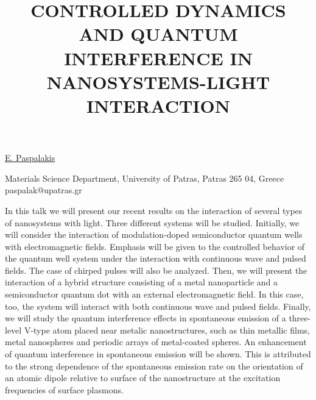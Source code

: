 \title{CONTROLLED DYNAMICS AND QUANTUM INTERFERENCE IN NANOSYSTEMS-LIGHT INTERACTION}

\underline{E. Paspalakis}


{\normalsize{\vspace{-4mm}
Materials Science Department,
University of Patras, Patras 265 04, Greece\\

\email paspalak@upatras.gr}}

In this talk we will present our recent results on the interaction
of several types of nanosystems with light. Three different
systems will be studied. Initially, we will consider the
interaction of modulation-doped semiconductor quantum wells with
electromagnetic fields. Emphasis will be given to the controlled
behavior of the quantum well system under the interaction with
continuous wave and pulsed fields. The case of chirped pulses
will also be analyzed. Then, we will present the interaction of a
hybrid structure consisting of a metal nanoparticle and a
semiconductor quantum dot with an external electromagnetic field.
In this case, too, the system will interact with both continuous
wave and pulsed fields. Finally, we will study the quantum
interference effects in spontaneous emission of a three-level
V-type atom placed near metalic nanostructures, such as thin
metallic films, metal nanospheres and periodic arrays of
metal-coated spheres. An enhancement of quantum interference in
spontaneous emission will be shown. This is attributed to the
strong dependence of the spontaneous emission rate on the
orientation of an atomic dipole relative to surface of the
nanostructure at the excitation frequencies of surface plasmons.

\vspace{\baselineskip}